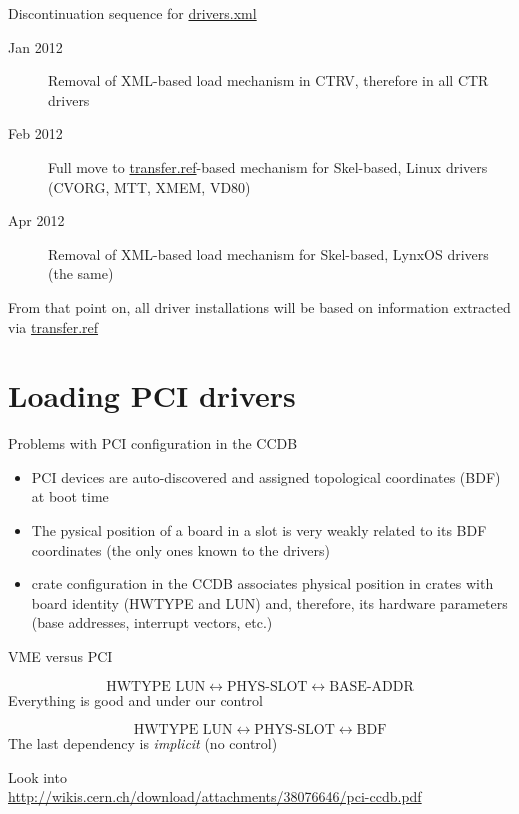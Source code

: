 \documentclass[compress,red]{beamer}
\begin{document}
\begin{frame}{Discontinuation sequence for \url{drivers.xml}}

\begin{description}
\pause
\item[Jan 2012] Removal of XML-based load mechanism in CTRV, therefore
	in all CTR drivers
\pause
\item[Feb 2012] Full move to \url{transfer.ref}-based mechanism
	for Skel-based, Linux drivers (CVORG, MTT, XMEM, VD80)
\pause
\item[Apr 2012] Removal of XML-based load mechanism for Skel-based,
	LynxOS drivers (the same)
\end{description}

\pause
From that point on, all driver installations will be based on
information extracted via \url{transfer.ref}
\end{frame}

\section{Loading PCI drivers}

\begin{frame}{Problems with PCI configuration in the CCDB}

\begin{itemize}
\pause
\item PCI devices are auto-discovered and assigned topological
coordinates (BDF) at boot time
\pause
\item The pysical position of a board in a slot is very weakly related
to its BDF coordinates (the only ones known to the drivers)
\pause
\item crate configuration in the CCDB associates physical position
in crates with board identity (HWTYPE and LUN) and, therefore, its
hardware parameters (base addresses, interrupt vectors, etc.)
\end{itemize}
\end{frame}

\begin{frame}{VME versus PCI}
\begin{description}


\pause
\item[In VME]
\begin{equation*}
	\text{HWTYPE LUN} \leftrightarrow
	\text{PHYS-SLOT} \leftrightarrow
	\text{BASE-ADDR}
\end{equation*}
\pause
Everything is good and under our control

\pause
\item[In PCI]
\begin{equation*}
	\text{HWTYPE LUN} \leftrightarrow
	\text{PHYS-SLOT} \leftrightarrow
	\text{BDF}
\end{equation*}
\pause
The last dependency is \emph{implicit} (no control)

\pause
\item[To know more] Look into \\
\url{http://wikis.cern.ch/download/attachments/38076646/pci-ccdb.pdf}
\end{description}
\end{frame}
\end{document}
